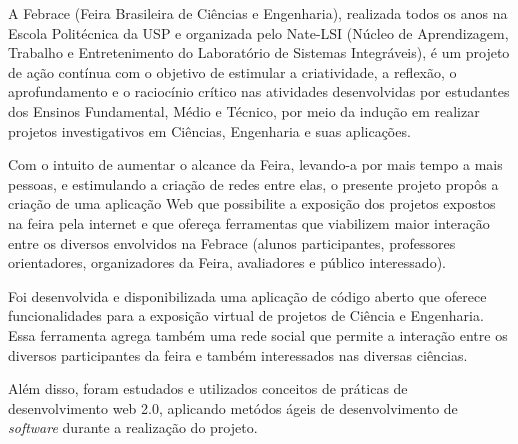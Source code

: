 
\begin{resumo}

A Febrace (Feira Brasileira de Ciências e Engenharia), realizada todos os anos na Escola Politécnica da USP e organizada pelo Nate-LSI (Núcleo de Aprendizagem, Trabalho e Entretenimento do Laboratório de Sistemas Integráveis), é um projeto de ação contínua com o objetivo de estimular a criatividade, a reflexão, o aprofundamento e o raciocínio crítico nas atividades desenvolvidas por estudantes dos Ensinos Fundamental, Médio e Técnico, por meio da indução em realizar projetos investigativos em Ciências, Engenharia e suas aplicações.

Com o intuito de aumentar o alcance da Feira, levando-a por mais tempo a mais pessoas, e estimulando a criação de redes entre elas, o presente projeto propôs a criação de uma aplicação Web que possibilite a exposição dos projetos expostos na feira pela internet e que ofereça ferramentas que viabilizem maior interação entre os diversos envolvidos na Febrace (alunos participantes, professores orientadores, organizadores da Feira, avaliadores e público interessado).

Foi desenvolvida e disponibilizada uma aplicação de código aberto que oferece funcionalidades para a exposição virtual de projetos de Ciência e Engenharia. Essa ferramenta agrega também uma rede social que permite a interação entre os diversos participantes da feira e também interessados nas diversas ciências.

Além disso, foram estudados e utilizados conceitos de práticas de desenvolvimento web 2.0, aplicando metódos ágeis de desenvolvimento de \textit{software} durante a realização do projeto.

\end{resumo}

